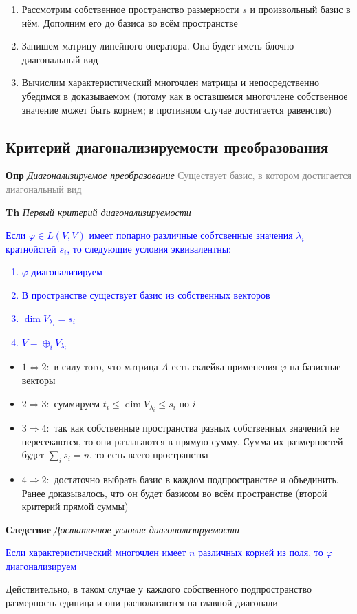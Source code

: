     \begin{enumerate}
        \item Рассмотрим собственное пространство размерности $s$ и произвольный базис в нём.
        Дополним его до базиса во всём пространстве
        \item Запишем матрицу линейного оператора.
        Она будет иметь блочно-диагональный вид
        \item Вычислим характеристический многочлен матрицы и непосредственно убедимся в доказываемом (потому как в
        оставшемся многочлене собственное значение может быть корнем; в противном случае достигается
        равенство)
    \end{enumerate}

     \subsection{Критерий диагонализируемости преобразования}

    \textbf{Опр} \textit{Диагонализируемое преобразование} \textcolor{gray}{Существует базис, в котором достигается
    диагональный вид}

    \textbf{Th} \textit{Первый критерий диагонализируемости}

    \textcolor{blue}{Если $\varphi \in L(V, V)$ имеет попарно различные собтсвенные значения $\lambda_i$
        кратнойстей $s_i$, то следующие условия эквивалентны:
    \begin{enumerate}
        \item $\varphi$ диагонализируем
        \item В пространстве существует базис из собственных векторов
        \item $\dim V_{\lambda_i} = s_i$
        \item $V = \oplus_i V_{\lambda_i}$
    \end{enumerate}             }

\begin{itemize}
    \item $1 \Leftrightarrow 2:$ в силу того, что матрица $A$ есть склейка применения $\varphi$ на базисные векторы
    \item $2 \Rightarrow 3:$ суммируем $t_i \leq \dim V_{\lambda_i} \leq s_i$ по $i$
    \item $3 \Rightarrow 4:$ так как собственные пространства разных собственных значений не пересекаются, то они
    разлагаются в прямую сумму.
    Сумма их размерностей будет $\sum_i s_i = n$, то есть всего пространства
    \item $4 \Rightarrow 2:$ достаточно выбрать базис в каждом подпространстве и объединить.
    Ранее доказывалось, что он будет базисом во всём пространстве (второй критерий прямой суммы)
\end{itemize}

     \textbf{Следствие} \textit{Достаточное условие диагонализируемости}

    \textcolor{blue}{Если характеристический многочлен имеет $n$ различных корней из поля, то $\varphi$
        диагонализируем}

    Действительно, в таком случае у каждого собственного подпространство размерность единица и они располагаются на
    главной диагонали